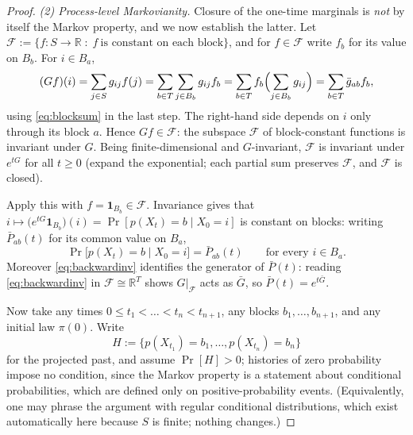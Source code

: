 \documentclass[11pt,reqno]{amsart}
\theoremstyle{plain}
\theoremstyle{definition}
\theoremstyle{remark}
\begin{document}
\begin{proof}
\emph{(2) Process-level Markovianity.} Closure of the one-time marginals is \emph{not} by itself the Markov property, and we now establish the latter. Let $\mathcal F:=\{f\colon S\to\mathbb R\;:\;f\ \text{is constant on each block}\}$, and for $f\in\mathcal F$ write $f_b$ for its value on $B_b$. For $i\in B_a$,
\begin{equation}\label{eq:backwardinv}
(Gf)(i)=\sum_{j\in S}g_{ij}f(j)=\sum_{b\in T}\sum_{j\in B_b}g_{ij}f_b=\sum_{b\in T}f_b\Bigl(\sum_{j\in B_b}g_{ij}\Bigr)=\sum_{b\in T}\bar g_{ab}f_b ,
\end{equation}
using \eqref{eq:blocksum} in the last step. The right-hand side depends on $i$ only through its block $a$. Hence $Gf\in\mathcal F$: the subspace $\mathcal F$ of block-constant functions is invariant under $G$. Being finite-dimensional and $G$-invariant, $\mathcal F$ is invariant under $e^{tG}$ for all $t\ge0$ (expand the exponential; each partial sum preserves $\mathcal F$, and $\mathcal F$ is closed).

Apply this with $f=\mathbf 1_{B_b}\in\mathcal F$. Invariance gives that $i\mapsto\bigl(e^{tG}\mathbf 1_{B_b}\bigr)(i)=\Pr[p(X_t)=b\mid X_0=i]$ is constant on blocks: writing $\bar P_{ab}(t)$ for its common value on $B_a$,
\begin{equation}\label{eq:blockconstant}
\Pr\bigl[p(X_t)=b\mid X_0=i\bigr]=\bar P_{ab}(t)\qquad\text{for every }i\in B_a .
\end{equation}
Moreover \eqref{eq:backwardinv} identifies the generator of $\bar P(t)$: reading \eqref{eq:backwardinv} in $\mathcal F\cong\mathbb R^{T}$ shows $G|_{\mathcal F}$ acts as $\bar G$, so $\bar P(t)=e^{t\bar G}$.

Now take any times $0\le t_1<\dots<t_n<t_{n+1}$, any blocks $b_1,\dots,b_{n+1}$, and any initial law $\pi(0)$. Write
\[
H:=\{p(X_{t_1})=b_1,\dots,p(X_{t_n})=b_n\}
\]
for the projected past, and assume $\Pr[H]>0$; histories of zero probability impose no condition, since the Markov property is a statement about conditional probabilities, which are defined only on positive-probability events. (Equivalently, one may phrase the argument with regular conditional distributions, which exist automatically here because $S$ is finite; nothing changes.)


\end{proof}
\end{document}
